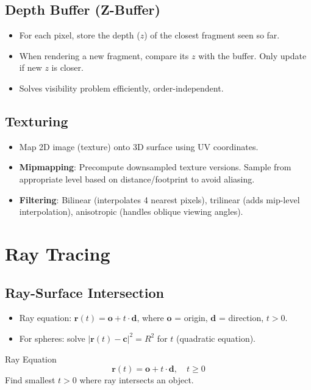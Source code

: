 \documentclass[11pt]{article}
\begin{document}
\subsection{Depth Buffer (Z-Buffer)}
\begin{itemize}
    \item For each pixel, store the depth ($z$) of the closest fragment seen so far.
    \item When rendering a new fragment, compare its $z$ with the buffer. Only update if new $z$ is closer.
    \item Solves visibility problem efficiently, order-independent.
\end{itemize}

\subsection{Texturing}
\begin{itemize}
    \item Map 2D image (texture) onto 3D surface using UV coordinates.
    \item \textbf{Mipmapping}: Precompute downsampled texture versions. Sample from appropriate level based on distance/footprint to avoid aliasing.
    \item \textbf{Filtering}: Bilinear (interpolates 4 nearest pixels), trilinear (adds mip-level interpolation), anisotropic (handles oblique viewing angles).
\end{itemize}

\section{Ray Tracing}
\subsection{Ray-Surface Intersection}
\begin{itemize}
    \item Ray equation: $\mathbf{r}(t) = \mathbf{o} + t \cdot \mathbf{d}$, where $\mathbf{o}$ = origin, $\mathbf{d}$ = direction, $t > 0$.
    \item For spheres: solve $|\mathbf{r}(t) - \mathbf{c}|^2 = R^2$ for $t$ (quadratic equation).
\end{itemize}

\begin{formulabox}{Ray Equation}
$$\mathbf{r}(t) = \mathbf{o} + t \cdot \mathbf{d}, \quad t \geq 0$$
Find smallest $t > 0$ where ray intersects an object.
\end{formulabox}
\end{document}
